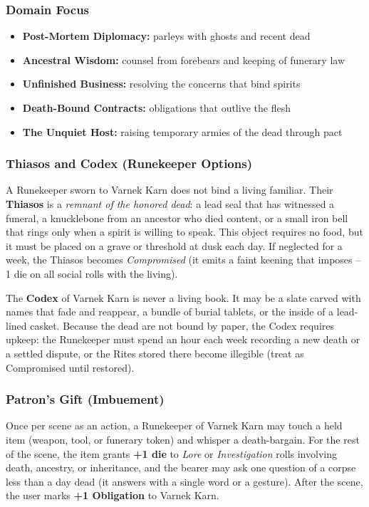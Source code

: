 \subsubsection*{Domain Focus}
\begin{itemize}
  \item \textbf{Post-Mortem Diplomacy:} parleys with ghosts and recent dead
  \item \textbf{Ancestral Wisdom:} counsel from forebears and keeping of funerary law
  \item \textbf{Unfinished Business:} resolving the concerns that bind spirits
  \item \textbf{Death-Bound Contracts:} obligations that outlive the flesh
  \item \textbf{The Unquiet Host:} raising temporary armies of the dead through pact
\end{itemize}

\subsubsection*{Thiasos and Codex (Runekeeper Options)}

A Runekeeper sworn to Varnek Karn does not bind a living familiar. Their \textbf{Thiasos} is a \textit{remnant of the honored dead}: a lead seal that has witnessed a funeral, a knucklebone from an ancestor who died content, or a small iron bell that rings only when a spirit is willing to speak. This object requires no food, but it must be placed on a grave or threshold at dusk each day. If neglected for a week, the Thiasos becomes \textit{Compromised} (it emits a faint keening that imposes --1 die on all social rolls with the living).

The \textbf{Codex} of Varnek Karn is never a living book. It may be a slate carved with names that fade and reappear, a bundle of burial tablets, or the inside of a lead-lined casket. Because the dead are not bound by paper, the Codex requires upkeep: the Runekeeper must spend an hour each week recording a new death or a settled dispute, or the Rites stored there become illegible (treat as Compromised until restored).

\subsubsection*{Patron's Gift (Imbuement)}

Once per scene as an action, a Runekeeper of Varnek Karn may touch a held item (weapon, tool, or funerary token) and whisper a death-bargain. For the rest of the scene, the item grants \textbf{+1 die} to \textit{Lore} or \textit{Investigation} rolls involving death, ancestry, or inheritance, and the bearer may ask one question of a corpse less than a day dead (it answers with a single word or a gesture). After the scene, the user marks \textbf{+1 Obligation} to Varnek Karn.

